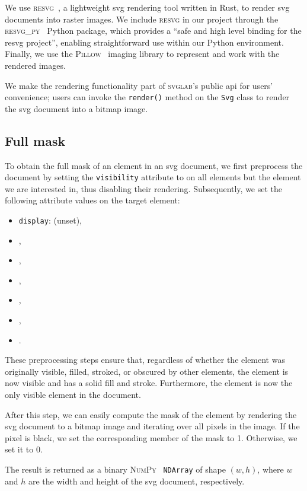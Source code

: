 We use \textsc{resvg}~\cite{resvg}, a lightweight \gls{svg} rendering tool written in Rust, to render \gls{svg} documents into raster images. We include \textsc{resvg} in our project through the \textsc{resvg\_py}~\cite{resvg_py} Python package, which provides a \enquote{safe and high level binding for the resvg project}, enabling straightforward use within our Python environment. Finally, we use the \textsc{Pillow}~\cite{pillow} imaging library to represent and work with the rendered images. 

We make the rendering functionality part of \textsc{svglab}'s public \gls{api} for users' convenience; users can invoke the \texttt{render()} method on the \texttt{Svg} class to render the \gls{svg} document into a bitmap image.

\subsection{Full mask}

To obtain the full mask of an element in an \gls{svg} document, we first preprocess the document by setting the \texttt{visibility} attribute to  on all elements but the element we are interested in, thus disabling their rendering. Subsequently, we set the following attribute values on the target element:
\begin{itemize}
    \item \texttt{display}: (unset),
    \item {},
    \item {},
    \item {},
    \item {},
    \item {},
    \item {}.
\end{itemize}
These preprocessing steps ensure that, regardless of whether the element was originally visible, filled, stroked, or obscured by other elements, the element is now visible and has a solid fill and stroke. Furthermore, the element is now the only visible element in the document.

After this step, we can easily compute the mask of the element by rendering the \gls{svg} document to a bitmap image and iterating over all pixels in the image. If the pixel is black, we set the corresponding member of the mask to 1. Otherwise, we set it to 0.

The result is returned as a binary \textsc{NumPy}~\cite{numpy} \texttt{NDArray} of shape $(w, h)$, where $w$ and $h$ are the width and height of the \gls{svg} document, respectively.

